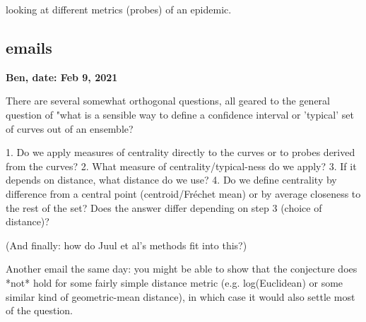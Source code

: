 \documentclass[12pt]{article}
\theoremstyle{definition} %
\begin{document}
\cite{probert2016decision} looking at different metrics (probes) of an epidemic.
\subsection{emails}

{\bf Ben,  
date: Feb 9, 2021}

There are several somewhat orthogonal questions, all geared to the general question of "what is a sensible way to define a confidence interval or 'typical' set of curves out of an ensemble?

 1. Do we apply measures of centrality directly to the curves or to
probes derived from the curves?
 2.  What measure of centrality/typical-ness do we apply?
 3.  If it depends on distance, what distance do we use?
 4. Do we define centrality by difference from a central point
(centroid/Fréchet mean) or by average closeness to the rest of the
set? Does the answer differ depending on step 3 (choice of distance)?

(And finally: how do Juul et al's methods fit into this?)

Another email the same day:
you might be able to show that the conjecture does *not* hold for some fairly simple distance metric (e.g. log(Euclidean) or some similar kind of geometric-mean distance), in which case it would also settle most of the question.
\end{document}
